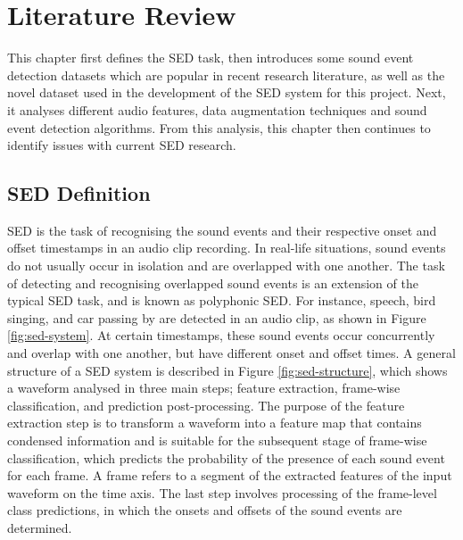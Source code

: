 \linespread{1.3}
\chapter{Literature Review}
This chapter first defines the SED task, then introduces some sound event detection datasets which are popular in recent research literature, as well as the novel dataset used in the development of the SED system for this project. Next, it analyses different audio features, data augmentation techniques and sound event detection algorithms. From this analysis, this chapter then continues to identify issues with current SED research. 

\section{SED Definition}
SED is the task of recognising the sound events and their respective onset and offset timestamps in an audio clip recording. In real-life situations, sound events do not usually occur in isolation and are overlapped with one another. The task of detecting and recognising overlapped sound events is an extension of the typical SED task, and is known as polyphonic SED. For instance, speech, bird singing, and car passing by are detected in an audio clip, as shown in Figure \ref{fig:sed-system}. At certain timestamps, these sound events occur concurrently and overlap with one another, but have different onset and offset times. A general structure of a SED system is described in Figure \ref{fig:sed-structure}, which shows a waveform analysed in three main steps; feature extraction, frame-wise classification, and prediction post-processing. The purpose of the feature extraction step is to transform a waveform into a feature map that contains condensed information and is suitable for the subsequent stage of frame-wise classification, which predicts the probability of the presence of each sound event for each frame. A frame refers to a segment of the extracted features of the input waveform on the time axis. The last step involves processing of the frame-level class predictions, in which the onsets and offsets of the sound events are determined.

